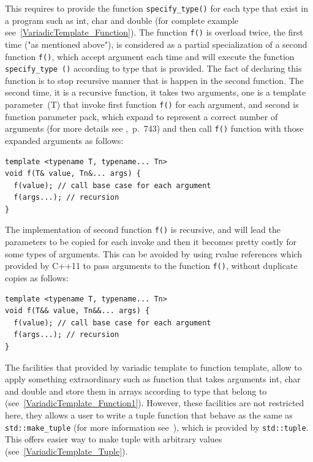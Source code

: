 \documentclass[11pt]{report}
\begin{document}
This requires to provide the function \texttt{specify\_type()} for each type that exist in a program such as int, char and double (for complete example see~\ref{VariadicTemplate_Function}). The function \texttt{f()} is overload twice, the first time ("as mentioned above"), is considered as a partial specialization of a second function \texttt{f()}, which accept argument each time and will execute the function \texttt{specify\_type~()} according to type that is provided. The fact of declaring this function is to stop recursive manner that is happen in the second function. The second time, it is a recursive function, it takes two arguments, one is a template parameter~(T) that invoke first function \texttt{f()} for each argument, and second is function parameter pack, which expand to represent a correct number of arguments (for more details see \cite{Gregorie:professionalcpp},~p.~743) and then call \texttt{f()} function with those expanded arguments as follows:
\begin{lstlisting}
template <typename T, typename... Tn>
void f(T& value, Tn&... args) {
  f(value); // call base case for each argument
  f(args...); // recursion
}
\end{lstlisting}
The implementation of second function \texttt{f()} is recursive, and will lead the parameters to be copied for each invoke and then it becomes pretty costly for some types of arguments. This can be avoided by using rvalue references which provided by C++11 to pass arguments to the function \texttt{f()}, without duplicate copies as follows:
\begin{lstlisting}
template <typename T, typename... Tn>
void f(T&& value, Tn&&... args) {
  f(value); // call base case for each argument
  f(args...); // recursion
}
\end{lstlisting}

The facilities that provided by variadic template to function template, allow to apply something extraordinary such as function that takes arguments int, char and double and store them in arrays according to type that belong to (see~\ref{VariadicTemplate_Function1}). However, these facilities are not restricted here, they allows a user to write a tuple function that behave as the same as \texttt{std::make\_tuple} (for more information see~\cite{Stroustrup:2012:Cpp11}), which is provided by \texttt{std::tuple}. This offers easier way to make tuple with arbitrary values (see~\ref{VariadicTemplate_Tuple}).


\end{document}
